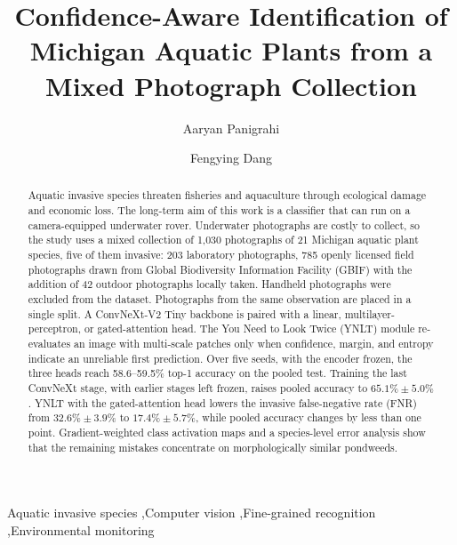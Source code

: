 \documentclass[final,3p,times,twocolumn]{elsarticle}
\begin{document}
\begin{frontmatter}

\title{Confidence-Aware Identification of Michigan Aquatic Plants from a Mixed Photograph Collection}

\author[label1]{Aaryan Panigrahi}
\author[label1]{Fengying Dang}


\address{Fengying Dang (fdang1@mtu.edu) is the corresponding author}
\address[label1]{Department of Electrical and Computer Engineering, Michigan Technological University, Houghton, MI 49931, USA}


\begin{abstract}
Aquatic invasive species threaten fisheries and aquaculture through ecological damage and economic loss. The long-term aim of this work is a classifier that can run on a camera-equipped underwater rover. Underwater photographs are costly to collect, so the study uses a mixed collection of 1{,}030 photographs of 21 Michigan aquatic plant species, five of them invasive: 203 laboratory photographs, 785 openly licensed field photographs drawn from Global Biodiversity Information Facility (GBIF) with the addition of 42 outdoor photographs locally taken. Handheld photographs were excluded from the dataset. Photographs from the same observation are placed in a single split. A ConvNeXt-V2 Tiny backbone is paired with a linear, multilayer-perceptron, or gated-attention head. The You Need to Look Twice (YNLT) module re-evaluates an image with multi-scale patches only when confidence, margin, and entropy indicate an unreliable first prediction. Over five seeds, with the encoder frozen, the three heads reach 58.6--59.5\% top-1 accuracy on the pooled test. Training the last ConvNeXt stage, with earlier stages left frozen, raises pooled accuracy to \(65.1\% \pm 5.0\%\). YNLT with the gated-attention head lowers the invasive false-negative rate (FNR) from \(32.6\% \pm 3.9\%\) to \(17.4\% \pm 5.7\%\), while pooled accuracy changes by less than one point. Gradient-weighted class activation maps and a species-level error analysis show that the remaining mistakes concentrate on morphologically similar pondweeds.
\end{abstract}

\begin{keyword}
Aquatic invasive species \sep Computer vision \sep Fine-grained recognition \sep Environmental monitoring
\end{keyword}

\end{frontmatter}
\end{document}
